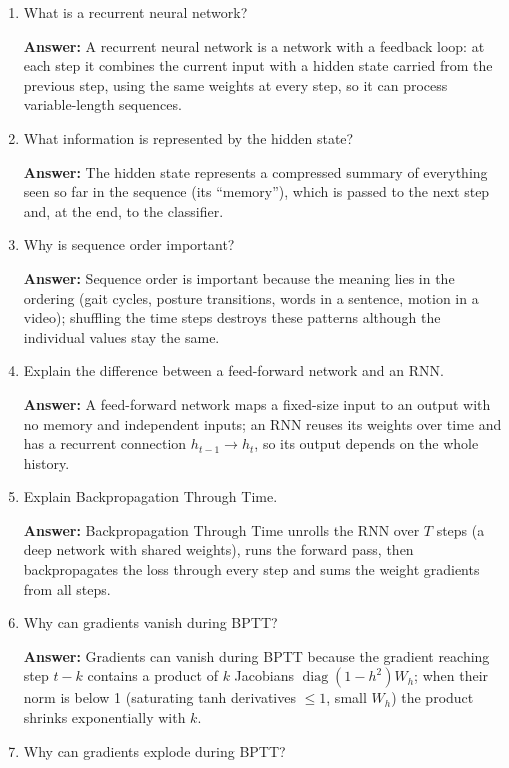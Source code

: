 \documentclass[10pt]{article}
\begin{document}
\begin{enumerate}
\item What is a recurrent neural network?

\textbf{Answer:} A recurrent neural network is a network with a feedback
loop: at each step it combines the current input with a hidden state
carried from the previous step, using the same weights at every step, so it
can process variable-length sequences.

\item What information is represented by the hidden state?

\textbf{Answer:} The hidden state represents a compressed summary of
everything seen so far in the sequence (its ``memory''), which is passed to
the next step and, at the end, to the classifier.

\item Why is sequence order important?

\textbf{Answer:} Sequence order is important because the meaning lies in
the ordering (gait cycles, posture transitions, words in a sentence, motion
in a video); shuffling the time steps destroys these patterns although the
individual values stay the same.

\item Explain the difference between a feed-forward network and an RNN.

\textbf{Answer:} A feed-forward network maps a fixed-size input to an
output with no memory and independent inputs; an RNN reuses its weights
over time and has a recurrent connection $h_{t-1}\to h_t$, so its output
depends on the whole history.

\item Explain Backpropagation Through Time.

\textbf{Answer:} Backpropagation Through Time unrolls the RNN over $T$
steps (a deep network with shared weights), runs the forward pass, then
backpropagates the loss through every step and sums the weight gradients
from all steps.

\item Why can gradients vanish during BPTT?

\textbf{Answer:} Gradients can vanish during BPTT because the gradient
reaching step $t-k$ contains a product of $k$ Jacobians
$\operatorname{diag}(1-h^2)W_h$; when their norm is below 1 (saturating
tanh derivatives $\le1$, small $W_h$) the product shrinks exponentially
with $k$.

\item Why can gradients explode during BPTT?


\end{enumerate}
\end{document}
